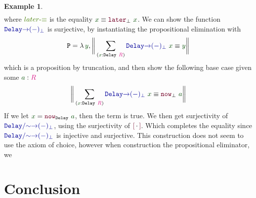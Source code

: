 \documentclass[twoside,11pt,openright]{report}
\theoremstyle{plain} %
\theoremstyle{definition}
\newtheorem{exmp}{Example} %
\theoremstyle{remark}
\newcommand*{\term}[1]{\textcolor{green!30!black}{#1}} %
\newcommand*{\pathterm}[1]{\textcolor{green!65!red!75!black}{#1}}
\newcommand*{\type}[1]{\textcolor{magenta!90!black}{#1}}
\newcommand*{\function}[1]{\textcolor{blue!60!black}{\ensuremath{\mathtt{#1}}}}
\newcommand*{\constructor}[1]{\textcolor{purple!60!black}{\ensuremath{\mathtt{#1}}}}
\newcommand*{\typeformer}[1]{\ensuremath{\mathtt{#1}}}
\newcommand*{\quotientconstructor}[1]{\constructor{[}\,#1\,\constructor{]}}
\begin{document}
\begin{exmp}
\begin{equation}
\begin{aligned}
    \end{aligned}
  \end{equation}
  where \(\pathterm{later\text{-}{\equiv}}\) is the equality \(\term{x} \equiv \constructor{later}_{\bot}~\term{x}\).
  We can show the function \(\function{Delay{\rightarrow}(-)_{\bot}}\) is surjective, by instantiating the propositional elimination with
  \begin{equation}
    \typeformer{P} = \lambda\,\term{y}, \bigg\| \sum_{(\term{x} : \typeformer{Delay}~\type{R})} \function{Delay{\rightarrow}(-)_{\bot}}~\term{x} \equiv \term{y} \bigg\|
  \end{equation}
  which is a proposition by truncation, and then show the following base case given some \(\term{a} : \type{R}\)
  \begin{equation}
    \bigg\| \sum_{(\term{x} : \typeformer{Delay}~\type{R})} \function{Delay{\rightarrow}(-)_{\bot}}~\term{x} \equiv \constructor{now}_{\bot}~\term{a} \bigg\|
  \end{equation}
  If we let \(\term{x} = \constructor{now}_{\typeformer{Delay}}~\term{a}\), then the term is true. We then get surjectivity of \(\function{Delay/{\sim}{\rightarrow}(-)_{\bot}}\), using the surjectivity of \(\quotientconstructor{{\cdot}}\). Which completes the equality since \(\function{Delay/{\sim}{\rightarrow}(-)_{\bot}}\) is injective and surjective. This construction does not seem to use the axiom of choice, however when construction the propositional eliminator, we
\end{exmp}

\chapter{Conclusion}
\label{ch:conclusion}
\end{document}
